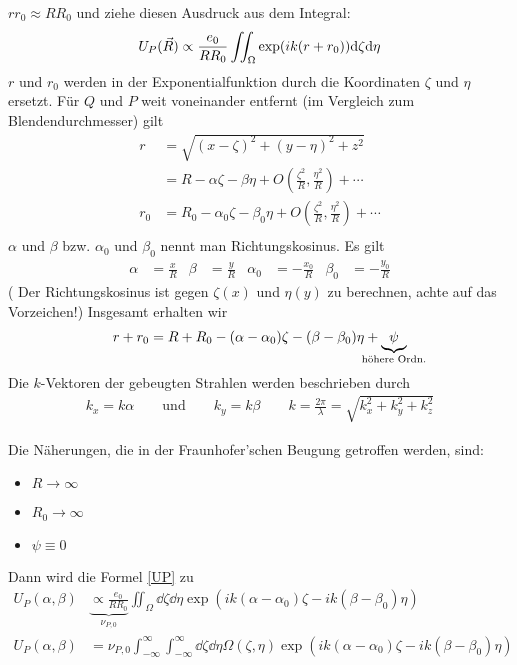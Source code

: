 $rr_0\approx RR_0$ und ziehe diesen Ausdruck aus dem Integral:
\begin{gather*}
  U_P(\vec{R}) \propto \frac{e_0}{RR_0} \iint_{\Omega} 
  \exp(ik(r+r_0)) \mathrm{d}\zeta\mathrm{d}\eta  
  \label{UP}
\end{gather*}
$r$ und $r_0$ werden in der Exponentialfunktion durch die Koordinaten
$\zeta$ und $\eta$ ersetzt.
Für $Q$ und $P$ weit voneinander entfernt (im Vergleich zum
Blendendurchmesser) gilt
\begin{align*}
  r &= \sqrt{(x-\zeta)^2+(y-\eta)^2+z^2} \\
    &= R-\alpha\zeta - \beta\eta 
      + O\left(\frac{\zeta^2}{R},\frac{\eta^2}{R}\right)
      + \dotsb \\
  r_0 &= R_0-\alpha_0\zeta - \beta_0\eta 
        + O\left(\frac{\zeta^2}{R},\frac{\eta^2}{R}\right)
        + \dotsb \\
\end{align*}
$\alpha$ und $\beta$ bzw. $\alpha_0$ und $\beta_0$ nennt man
Richtungskosinus. Es gilt
\begin{align*}
  \alpha &= \frac{x}{R}
  &\beta &= \frac{y}{R}
  &\alpha_0 &= -\frac{x_0}{R}
  &\beta_0 &= -\frac{y_0}{R}
\end{align*}
( Der Richtungskosinus ist gegen $\zeta(x)$ und $\eta(y)$ zu
berechnen, achte auf das Vorzeichen!)
Insgesamt erhalten wir
\begin{align*}
  r+r_0 = R+R_0 - (\alpha-\alpha_0)\zeta - (\beta-\beta_0)\eta 
  + \underbrace{\psi}_{\mathclap{\text{höhere Ordn.}}}
\end{align*}
Die $k$-Vektoren der gebeugten Strahlen werden beschrieben durch
\begin{align*}
  k_x = k\alpha \qquad \text{und}\qquad k_y = k\beta
  \qquad k=\frac{2\pi}{\lambda}=\sqrt{k_x^2+k_y^2+k_z^2}
\end{align*}

Die Näherungen, die in der Fraunhofer'schen Beugung getroffen werden,
sind:
\begin{itemize}
\item $R\rightarrow\infty$
\item $R_0\rightarrow\infty$
\item $\psi\equiv 0$
\end{itemize}
Dann wird die Formel \eqref{UP} zu
\begin{align*}
  U_P(\alpha,\beta) 
  & \underbrace{\propto \frac{e_0}{RR_0}}_{\nu_{P,0}} 
    \iint_{\Omega} \dd\zeta\dd\eta
    \exp\left( ik(\alpha-\alpha_0)\zeta - ik(\beta-\beta_0)\eta \right)\\
  U_P(\alpha,\beta) 
  &= \nu_{P,0} \int_{-\infty}^{\infty}\int_{-\infty}^{\infty}
    \dd\zeta\dd\eta \Omega(\zeta,\eta)
    \exp\left( ik(\alpha-\alpha_0)\zeta - ik(\beta-\beta_0)\eta \right)
\end{align*}


